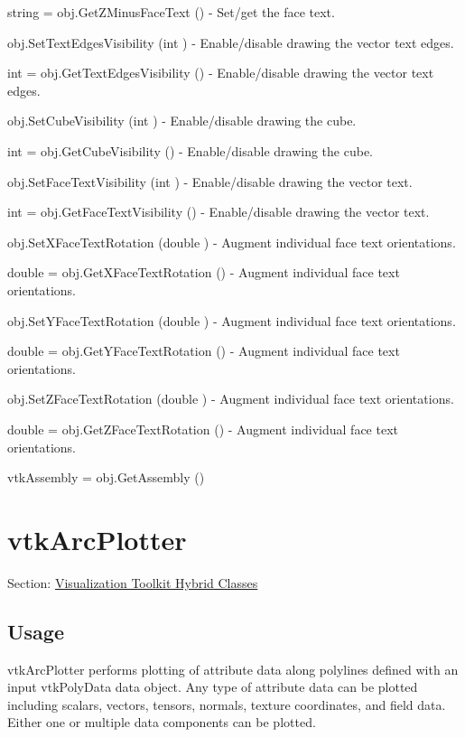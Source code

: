 \begin{DoxyItemize}
\item {\ttfamily string = obj.\-Get\-Z\-Minus\-Face\-Text ()} -\/ Set/get the face text.  
\item {\ttfamily obj.\-Set\-Text\-Edges\-Visibility (int )} -\/ Enable/disable drawing the vector text edges.  
\item {\ttfamily int = obj.\-Get\-Text\-Edges\-Visibility ()} -\/ Enable/disable drawing the vector text edges.  
\item {\ttfamily obj.\-Set\-Cube\-Visibility (int )} -\/ Enable/disable drawing the cube.  
\item {\ttfamily int = obj.\-Get\-Cube\-Visibility ()} -\/ Enable/disable drawing the cube.  
\item {\ttfamily obj.\-Set\-Face\-Text\-Visibility (int )} -\/ Enable/disable drawing the vector text.  
\item {\ttfamily int = obj.\-Get\-Face\-Text\-Visibility ()} -\/ Enable/disable drawing the vector text.  
\item {\ttfamily obj.\-Set\-X\-Face\-Text\-Rotation (double )} -\/ Augment individual face text orientations.  
\item {\ttfamily double = obj.\-Get\-X\-Face\-Text\-Rotation ()} -\/ Augment individual face text orientations.  
\item {\ttfamily obj.\-Set\-Y\-Face\-Text\-Rotation (double )} -\/ Augment individual face text orientations.  
\item {\ttfamily double = obj.\-Get\-Y\-Face\-Text\-Rotation ()} -\/ Augment individual face text orientations.  
\item {\ttfamily obj.\-Set\-Z\-Face\-Text\-Rotation (double )} -\/ Augment individual face text orientations.  
\item {\ttfamily double = obj.\-Get\-Z\-Face\-Text\-Rotation ()} -\/ Augment individual face text orientations.  
\item {\ttfamily vtk\-Assembly = obj.\-Get\-Assembly ()}  
\end{DoxyItemize}\hypertarget{vtkhybrid_vtkarcplotter}{}\section{vtk\-Arc\-Plotter}\label{vtkhybrid_vtkarcplotter}
Section\-: \hyperlink{sec_vtkhybrid}{Visualization Toolkit Hybrid Classes} \hypertarget{vtkwidgets_vtkxyplotwidget_Usage}{}\subsection{Usage}\label{vtkwidgets_vtkxyplotwidget_Usage}
vtk\-Arc\-Plotter performs plotting of attribute data along polylines defined with an input vtk\-Poly\-Data data object. Any type of attribute data can be plotted including scalars, vectors, tensors, normals, texture coordinates, and field data. Either one or multiple data components can be plotted.


